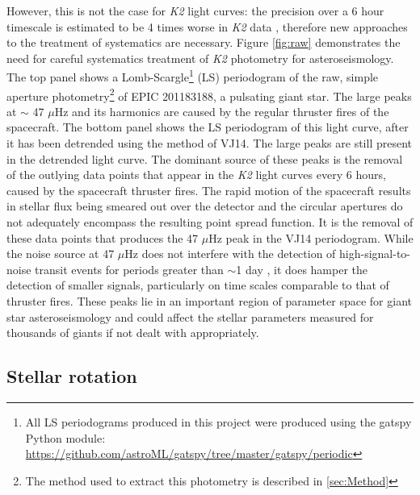 However, this is not the case for {\it K2} light curves: the precision over a
6 hour timescale is estimated to be 4 times worse in {\it K2} data
\citep{Howell2014}, therefore new approaches to the treatment of systematics
are necessary.
Figure \ref{fig:raw} demonstrates the need for careful systematics treatment
of {\it K2} photometry for asteroseismology.
The top panel shows a Lomb-Scargle\footnote{All LS periodograms
produced in this project were produced using the gatspy Python module:
\url{https://github.com/astroML/gatspy/tree/master/gatspy/periodic}} (LS)
periodogram of the raw, simple aperture photometry\footnote{The method used to
extract this photometry is described in \textsection \ref{sec:Method}} of EPIC
201183188, a pulsating giant star.
The large peaks at $\sim$ 47 $\mu$Hz and its harmonics are caused by the
regular thruster fires of the spacecraft.
The bottom panel shows the LS periodogram of this light curve, after
it has been detrended using the method of VJ14.
The large peaks are still present in the detrended light curve.
The dominant source of these peaks is the removal of the outlying data points
that appear in the {\it K2} light curves every 6 hours, caused by the
spacecraft thruster fires.
The rapid motion of the spacecraft results in stellar flux being smeared out
over the detector and the circular apertures do not adequately encompass the
resulting point spread function.
It is the removal of these data points that produces the 47 $\mu$Hz peak in
the VJ14 periodogram.
While the noise source at 47 $\mu$Hz does not interfere with the detection of
high-signal-to-noise transit events for periods greater than $\sim$1 day
\citep{Vanderburg2015}, it does hamper the detection of
smaller signals, particularly on time scales comparable to that of thruster
fires.
These peaks lie in an important region of parameter space for giant star
asteroseismology and could affect the stellar parameters measured for thousands
of giants if not dealt with appropriately.

\subsection{Stellar rotation}

